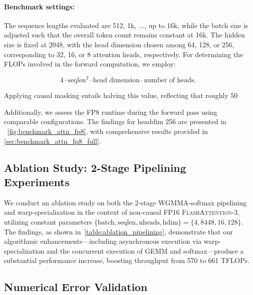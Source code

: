 \begin{itemize}
\paragraph{Benchmark settings:} The sequence lengths evaluated are 512, 1k, ..., up to 16k, while the batch size is adjusted such that the overall token count remains constant at 16k. The hidden size is fixed at 2048, with the head dimension chosen among 64, 128, or 256, corresponding to 32, 16, or 8 attention heads, respectively. For determining the FLOPs involved in the forward computation, we employ:

\begin{equation*}
  4 \cdot \text{seqlen}^2 \cdot \text{head dimension} \cdot \text{number of heads}.
\end{equation*}

Applying causal masking entails halving this value, reflecting that roughly 50%

Additionally, we assess the FP8 runtime during the forward pass using comparable configurations. The findings for headdim 256 are presented in ~\cref{fig:benchmark_attn_fp8}, with comprehensive results provided in \cref{sec:benchmark_attn_fp8_full}.

\subsection{Ablation Study: 2-Stage Pipelining Experiments}
\label{sec:2-stage-pipelining-experiments}

We conduct an ablation study on both the 2-stage WGMMA-softmax pipelining and warp-specialization in the context of non-causal FP16 \textsc{FlashAttention-3}, utilizing constant parameters $\{\text{batch}, \text{seqlen}, \text{nheads}, \text{hdim}\} = \{ 4, 8448, 16, 128\}$. The findings, as shown in~\cref{table:ablation_pipelining}, demonstrate that our algorithmic enhancements—including asynchronous execution via warp-specialization and the concurrent execution of GEMM and softmax—produce a substantial performance increase, boosting throughput from 570 to 661 TFLOPs.

\subsection{Numerical Error Validation}
\label{sec:numerical_error}


\end{itemize}
